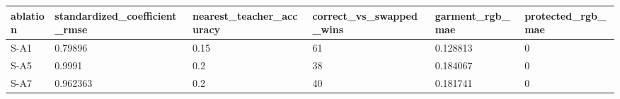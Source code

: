 \begin{tabular}{llllll}
ablation & standardized_coefficient_rmse & nearest_teacher_accuracy & correct_vs_swapped_wins & garment_rgb_mae & protected_rgb_mae \\
\hline
S-A1 & 0.79896 & 0.15 & 61 & 0.128813 & 0 \\
S-A5 & 0.9991 & 0.2 & 38 & 0.184067 & 0 \\
S-A7 & 0.962363 & 0.2 & 40 & 0.181741 & 0 \\
\end{tabular}
